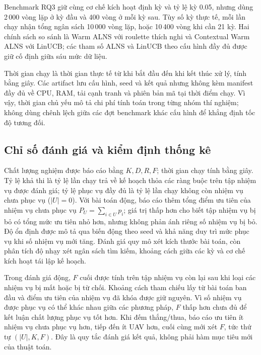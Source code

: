 \documentclass[11pt,a4paper]{article}
\begin{document}
Benchmark RQ3 giữ cùng cơ chế kích hoạt định kỳ và tỷ lệ kỳ 0.05, nhưng dùng 2\,000 vòng lặp ở kỳ đầu và 400 vòng ở mỗi kỳ sau. Tùy số kỳ thực tế, mỗi lần chạy nhận tổng ngân sách 10\,000 vòng lặp, hoặc 10\,400 vòng khi cần 21 kỳ. Hai chính sách so sánh là Warm ALNS với roulette thích nghi và Contextual Warm ALNS với LinUCB; các tham số ALNS và LinUCB theo cấu hình đầy đủ được giữ cố định giữa sáu mức dữ liệu.

Thời gian chạy là thời gian thực tế từ khi bắt đầu đến khi kết thúc xử lý, tính bằng giây. Các artifact lưu cấu hình, seed và kết quả nhưng không kèm manifest đầy đủ về CPU, RAM, tải cạnh tranh và phiên bản mã tại thời điểm chạy. Vì vậy, thời gian chủ yếu mô tả chi phí tính toán trong từng nhóm thí nghiệm; không dùng chênh lệch giữa các đợt benchmark khác cấu hình để khẳng định tốc độ tương đối.

\subsection{Chỉ số đánh giá và kiểm định thống kê}
Chất lượng nghiệm được báo cáo bằng $K,D,R,F$; thời gian chạy tính bằng giây. Tỷ lệ khả thi là tỷ lệ lần chạy trả về kế hoạch thỏa các ràng buộc trên tập nhiệm vụ được đánh giá; tỷ lệ phục vụ đầy đủ là tỷ lệ lần chạy không còn nhiệm vụ chưa phục vụ ($|U|=0$). Với bài toán động, báo cáo thêm tổng điểm ưu tiên của nhiệm vụ chưa phục vụ $P_U=\sum_{i\in U}p_i$; giá trị thấp hơn cho biết tập nhiệm vụ bị bỏ có tổng mức ưu tiên nhỏ hơn, nhưng không phản ánh riêng số nhiệm vụ bị bỏ. Độ ổn định được mô tả qua biến động theo seed và khả năng duy trì mức phục vụ khi số nhiệm vụ mới tăng. Đánh giá quy mô xét kích thước bài toán, còn phân tích độ nhạy xét ngân sách tìm kiếm, khoảng cách giữa các kỳ và cơ chế kích hoạt tái lập kế hoạch.

Trong đánh giá động, $F$ cuối được tính trên tập nhiệm vụ còn lại sau khi loại các nhiệm vụ bị mất hoặc bị từ chối. Khoảng cách tham chiếu lấy từ bài toán ban đầu và điểm ưu tiên của nhiệm vụ đã khóa được giữ nguyên. Vì số nhiệm vụ được phục vụ có thể khác nhau giữa các phương pháp, $F$ thấp hơn chưa đủ để kết luận chất lượng phục vụ tốt hơn. Khi đếm thắng/thua, báo cáo ưu tiên ít nhiệm vụ chưa phục vụ hơn, tiếp đến ít UAV hơn, cuối cùng mới xét $F$, tức thứ tự $(|U|,K,F)$. Đây là quy tắc đánh giá kết quả, không phải hàm mục tiêu mới của thuật toán.
\end{document}
